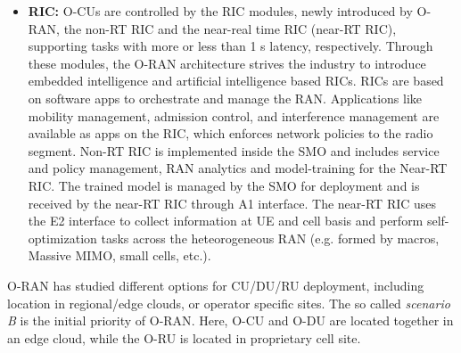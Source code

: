 \documentclass[journal]{IEEEtran}
\begin{document}
\begin{itemize}
    \item \textbf{RIC:} O-CUs are controlled by the RIC modules, newly introduced by {O-RAN}, the non-RT RIC and the near-real time RIC (near-RT RIC), supporting tasks with more or less than 1 s latency, respectively. Through these modules, the {O-RAN} architecture strives the industry to introduce embedded intelligence and artificial intelligence based RICs. RICs are based on software apps to orchestrate and manage the RAN. Applications like mobility management, admission control, and interference management are available as apps on the RIC, which enforces network policies to the radio segment. Non-RT RIC is implemented inside the SMO and includes service and policy management, RAN analytics and model-training for the Near-RT RIC. The trained model is managed by the SMO for deployment and is received by the near-RT RIC through A1 interface. The near-RT RIC uses the E2 interface to collect information at UE and cell basis and perform self-optimization tasks across the heteorogeneous RAN (e.g. formed by macros, Massive MIMO, small cells, etc.).
\end{itemize}
O-RAN has studied different options for CU/DU/RU deployment, including location in regional/edge clouds, or operator specific sites. The so called \textit{scenario B} is the initial priority of {O-RAN}. Here, O-CU and O-DU are located together in an edge cloud, while the O-RU is located in proprietary cell site. 

\end{document}

